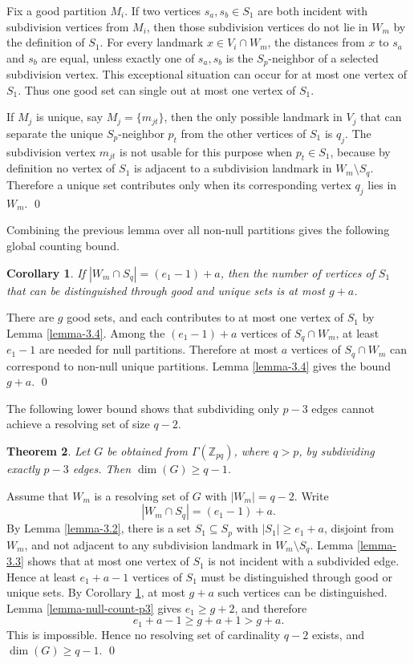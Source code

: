 \documentclass[12pt]{article}
\renewenvironment{proof}{{\bf \noindent Proof.}}{\qed}
\newtheorem{theorem}{Theorem}[section]
\newtheorem{corollary}[theorem]{Corollary}
\begin{document}
\begin{proof}
Fix a good partition $M_i$. If two vertices $s_a,s_b\in S_1$ are both incident with subdivision vertices from $M_i$, then those subdivision vertices do not lie in $W_m$ by the definition of $S_1$. For every landmark $x\in V_i\cap W_m$, the distances from $x$ to $s_a$ and $s_b$ are equal, unless exactly one of $s_a,s_b$ is the $S_p$-neighbor of a selected subdivision vertex. This exceptional situation can occur for at most one vertex of $S_1$. Thus one good set can single out at most one vertex of $S_1$.

If $M_j$ is unique, say $M_j=\{m_{jt}\}$, then the only possible landmark in $V_j$ that can separate the unique $S_p$-neighbor $p_t$ from the other vertices of $S_1$ is $q_j$. The subdivision vertex $m_{jt}$ is not usable for this purpose when $p_t\in S_1$, because by definition no vertex of $S_1$ is adjacent to a subdivision landmark in $W_m\setminus S_q$. Therefore a unique set contributes only when its corresponding vertex $q_j$ lies in $W_m$.
\end{proof}


\medskip
\noindent Combining the previous lemma over all non-null partitions gives the following global counting bound.
\begin{corollary}\label{coro-3.2}
If $|W_m\cap S_q|=(e_1-1)+a$, then the number of vertices of $S_1$ that can be distinguished through good and unique sets is at most $g+a$.
\end{corollary}

\begin{proof}
There are $g$ good sets, and each contributes to at most one vertex of $S_1$ by Lemma \ref{lemma-3.4}. Among the $(e_1-1)+a$ vertices of $S_q\cap W_m$, at least $e_1-1$ are needed for null partitions. Therefore at most $a$ vertices of $S_q\cap W_m$ can correspond to non-null unique partitions. Lemma \ref{lemma-3.4} gives the bound $g+a$.
\end{proof}


\medskip
\noindent The following lower bound shows that subdividing only $p-3$ edges cannot achieve a resolving set of size $q-2$.
\begin{theorem}\label{thm-p3-lower}
Let $G$ be obtained from $\Gamma(\mathbb Z_{pq})$, where $q>p$, by subdividing exactly $p-3$ edges. Then $\dim(G)\geq q-1$.
\end{theorem}

\begin{proof}
Assume that $W_m$ is a resolving set of $G$ with $|W_m|=q-2$. Write
$$
|W_m\cap S_q|=(e_1-1)+a.
$$
By Lemma \ref{lemma-3.2}, there is a set $S_1\subseteq S_p$ with $|S_1|\geq e_1+a$, disjoint from $W_m$, and not adjacent to any subdivision landmark in $W_m\setminus S_q$. Lemma \ref{lemma-3.3} shows that at most one vertex of $S_1$ is not incident with a subdivided edge. Hence at least $e_1+a-1$ vertices of $S_1$ must be distinguished through good or unique sets. By Corollary \ref{coro-3.2}, at most $g+a$ such vertices can be distinguished. Lemma \ref{lemma-null-count-p3} gives $e_1\geq g+2$, and therefore
$$
e_1+a-1\geq g+a+1>g+a.
$$
This is impossible. Hence no resolving set of cardinality $q-2$ exists, and $\dim(G)\geq q-1$.
\end{proof}
\end{document}
